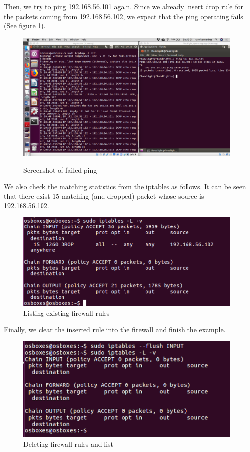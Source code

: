 \documentclass[paper=a4, fontsize=11pt]{scrartcl}
\numberwithin{equation}{section}		%
\numberwithin{figure}{section}			%
\numberwithin{table}{section}				%
\begin{document}
Then, we try to ping 192.168.56.101 again. Since we already insert drop rule for the packets coming from 192.168.56.102, we expect that the ping operating fails (See figure \ref{fail}).
\begin{figure}[H]
\centering
\includegraphics[width=\textwidth]{img/6.png}
\label{fail}
\caption{Screenshot of failed ping}
\end{figure}

We also check the matching statistics from the iptables as follows. It can be seen that there exist 15 matching (and dropped) packet whose source is 192.168.56.102.

\begin{figure}[H]
\centering
\includegraphics[width=\textwidth]{img/7.png}
\caption{Listing existing firewall rules}
\end{figure}

Finally, we clear the inserted rule into the firewall and finish the example.
\begin{figure}[H]
\centering
\includegraphics[width=\textwidth]{img/8.png}
\caption{Deleting firewall rules and list}
\end{figure}
\end{document}
